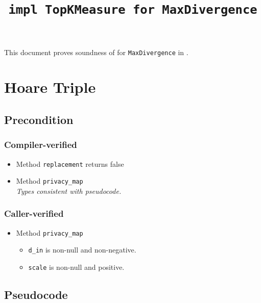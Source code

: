 \documentclass{article}
\title{\texttt{impl TopKMeasure for MaxDivergence}}
\author{\TudorCebereAuthor \and \MichaelShoemateAuthor}
\begin{document}
\maketitle
\contrib

This document proves soundness of  for \texttt{MaxDivergence} in .

\section{Hoare Triple}
\subsection*{Precondition}
\subsubsection*{Compiler-verified}
\begin{itemize}
    \item Method \texttt{replacement} returns false
    \item Method \texttt{privacy\_map} \\
        \textit{Types consistent with pseudocode.}
\end{itemize}

\subsubsection*{Caller-verified}
\begin{itemize}
    \item Method \texttt{privacy\_map}
        \begin{itemize}
            \item \texttt{d\_in} is non-null and non-negative.
            \item \texttt{scale} is non-null and positive.
        \end{itemize}
\end{itemize}

\subsection*{Pseudocode}
\label{sec:python-pseudocode}

\end{document}
